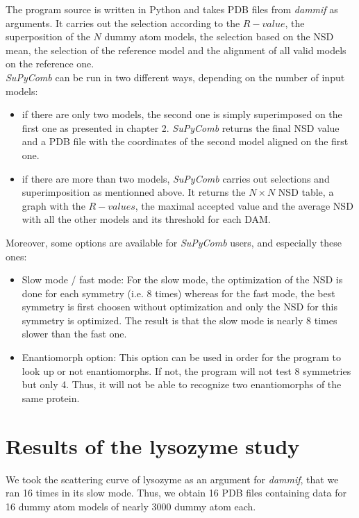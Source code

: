 \documentclass[a4paper, 11pt]{report}
\begin{document}
The program source is written in Python and takes PDB files from 
\textit{dammif} as arguments. 
It carries out the selection according to the $R-value$, the 
superposition of the $N$ dummy atom models, the selection based on the 
NSD mean, the selection of the reference model and the alignment of 
all valid models on the reference one.\\
\textit{SuPyComb} can be run in two different ways, depending on the 
number of input models:
\begin{itemize}
  \item if there are only two models, the second one is simply 
        superimposed on the first one as presented in chapter 2.
        \textit{SuPyComb} returns the final NSD value and a PDB file 
        with the coordinates of the second model aligned on the first one.
  \item if there are more than two models, \textit{SuPyComb} carries out 
        selections and superimposition as mentionned above. 
        It returns the $N \times N$ NSD table, a graph with the $R-values$, 
        the maximal accepted value and the average NSD with all the other 
        models and its threshold for each DAM.
\end{itemize}
Moreover, some options are available for \textit{SuPyComb} users, and 
especially these ones:
\begin{itemize}
  \item Slow mode / fast mode:
  For the slow mode, the optimization of the NSD is done for each symmetry 
  (i.e. 8 times) whereas for the fast mode, the best symmetry is first 
  choosen without optimization and only the NSD for this symmetry is 
  optimized.
  The result is that the slow mode is nearly 8 times slower than the fast 
  one.
  \item Enantiomorph option:
  This option can be used in order for the program to look up or not 
  enantiomorphs. 
  If not, the program will not test 8 symmetries but only 4. 
  Thus, it will not be able to recognize two enantiomorphs of the 
  same protein.
\end{itemize}

\section{Results of the lysozyme study}%

We took the scattering curve of lysozyme as an argument for 
\textit{dammif}, that we ran 16 times in its slow mode. 
Thus, we obtain 16 PDB files containing data for 16 dummy atom models 
of nearly 3000 dummy atom each.\\
\end{document}
